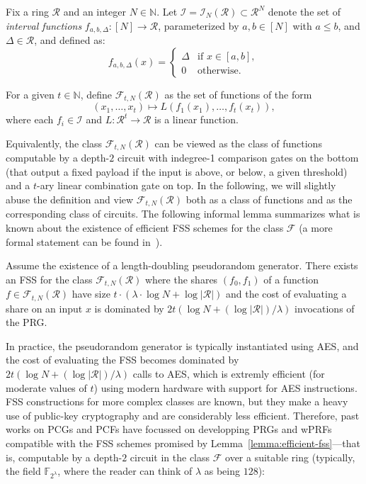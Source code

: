 \documentclass[journal=tosc,submission]{iacrtrans}
\theoremstyle{theorem}
\newcommand\setF{\ensuremath{\mathcal{F}}\xspace}
\newcommand\ring{\ensuremath{\mathcal{R}}\xspace}
\newcommand\setI{\ensuremath{\mathcal{I}}\xspace}
\renewcommand\secpar{\ensuremath{\lambda}\xspace}
\newcommand\F{\mathbb{F}}
\newcommand\lp[1]{\textcolor{blue!80}{\textbf{Léo:} #1}}
\begin{document}
\begin{definition}
Fix a ring $\ring$ and an integer $N \in \mathbb{N}$. Let $\setI = \setI_N(\ring) \subset \ring^{N}$ denote the set of \emph{interval functions} $f_{a,b,\Delta} : [N] \to \ring$, parameterized by $a,b \in [N]$ with $a \leq b$, and $\Delta \in \ring$, and defined as:
\[
f_{a,b,\Delta}(x) = 
\begin{cases}
\Delta & \text{if } x \in [a,b], \\
0 & \text{otherwise}.
\end{cases}
\]

For a given $t \in \mathbb{N}$, define $\setF_{t,N}(\ring)$ as the set of functions of the form
\[
(x_1, \dots, x_t) \mapsto L(f_1(x_1), \dots, f_t(x_t)),
\]
where each $f_i \in \setI$ and $L : \ring^t \to \ring$ is a linear function.
\end{definition}


Equivalently, the class $\setF_{t,N}(\ring)$ can be viewed as the class of functions computable by a depth-$2$ circuit with indegree-1 comparison gates on the bottom (that output a fixed payload if the input is above, or below, a given threshold) and a $t$-ary linear combination gate on top. In the following, we will slightly abuse the definition and view $\setF_{t,N}(\ring)$ both as a class of functions and as the corresponding class of circuits. The following informal lemma summarizes what is known about the existence of efficient FSS schemes for the class $\setF$ (a more formal statement can be found in~\cite{CCS:BoyGilIsh16}).
\begin{lemma}[Informal]
\label{lemma:efficient-fss}
Assume the existence of a length-doubling pseudorandom generator. There exists an FSS for the class $\setF_{t,N}(\ring)$ where the shares $(f_0,f_1)$ of a function $f\in\setF_{t,N}(\ring)$ have size $t\cdot (\secpar\cdot \log N + \log|\ring|)$ and the cost of evaluating a share on an input $x$ is dominated by $2t(\log N + (\log|\ring|)/\secpar)$ invocations of the PRG.
\end{lemma}

In practice, the pseudorandom generator is typically instantiated using {\sf AES}, and the cost of evaluating the FSS becomes dominated by $2t(\log N + (\log|\ring|)/\secpar)$ calls to {\sf AES}, which is extremly efficient (for moderate values of $t$) using modern hardware with support for {\sf AES} instructions. 
FSS constructions for more complex classes are known, but they make a heavy use of public-key cryptography and are considerably less efficient. Therefore, past works on PCGs and PCFs have focussed on developping PRGs and wPRFs compatible with the FSS schemes promised by Lemma~\ref{lemma:efficient-fss}---that is, computable by a depth-$2$ circuit in the class $\setF$ over a suitable ring (typically, the field $\F_{2^\secpar}$, where the reader can think of $\secpar$ as being $128$):
\end{document}
